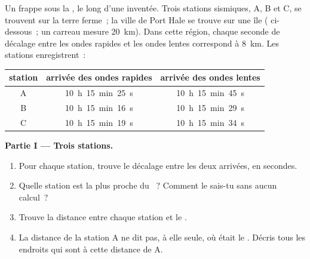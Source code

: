 \begin{problem}
\label{pb:g7:earthquakes:1}
Un  frappe sous la , le long d'une  inventée. Trois stations
sismiques, A, B et C, se trouvent sur la terre ferme~; la ville de Port
Hale se trouve sur une île ( ci-dessous~; un carreau mesure
\qty{20}{km}). Dans cette région, chaque seconde de décalage entre les
ondes rapides et les ondes lentes correspond à \qty{8}{km}. Les stations
enregistrent~:

\begin{center}
\small
\begin{tabular}{|c|c|c|}
\hline
\textbf{station} & \textbf{arrivée des ondes rapides} & \textbf{arrivée des ondes lentes} \\
\hline
A & 10~h~15~min~25~s & 10~h~15~min~45~s \\
B & 10~h~15~min~16~s & 10~h~15~min~29~s \\
C & 10~h~15~min~19~s & 10~h~15~min~34~s \\
\hline
\end{tabular}
\end{center}

\medskip
\noindent\textbf{Partie I --- Trois stations.}\par\nopagebreak
\begin{enumerate}[beginpenalty=10000]
  \item Pour chaque station, trouve le décalage entre les deux arrivées, en
        secondes.
  \item Quelle station est la plus proche du ~? Comment le sais-tu
        sans aucun calcul~?
  \item Trouve la distance entre chaque station et le .
  \item La distance de la station A ne dit pas, à elle seule, où était le
        . Décris tous les endroits qui sont à cette distance de A.
\end{enumerate}


\end{problem}
